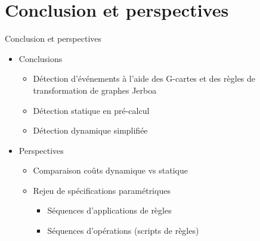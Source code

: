 \documentclass[presentation]{beamer}
\begin{document}
\section{Conclusion et perspectives}
\begin{frame}{Conclusion et perspectives}
  \begin{itemize}
    \item<1-> Conclusions
          \begin{itemize}
            \item<1-> Détection d'événements à l'aide des G-cartes et des règles
                  de transformation de graphes Jerboa
            \item<2-> Détection statique en pré-calcul
            \item<3-> Détection dynamique simplifiée
          \end{itemize}
          \vspace*{1em}
    \item<4-> Perspectives
          \begin{itemize}
            \item<4-> Comparaison coûts dynamique vs statique
            \item<5-> Rejeu de spécifications paramétriques
                  \begin{itemize}
                    \item<6-> Séquences d'applications de règles
                    \item<7-> Séquences d'opérations (scripts de règles)
                  \end{itemize}
          \end{itemize}

  \end{itemize}

\end{frame}

\end{document}
